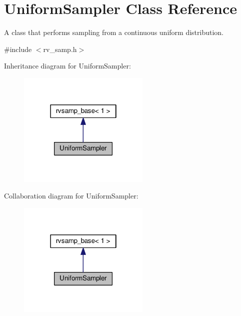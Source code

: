 \hypertarget{classUniformSampler}{}\section{Uniform\+Sampler Class Reference}
\label{classUniformSampler}


A class that performs sampling from a continuous uniform distribution.  




{\ttfamily \#include $<$rv\+\_\+samp.\+h$>$}



Inheritance diagram for Uniform\+Sampler\+:\nopagebreak
\begin{figure}[H]
\begin{center}
\leavevmode
\includegraphics[width=178pt]{classUniformSampler__inherit__graph}
\end{center}
\end{figure}


Collaboration diagram for Uniform\+Sampler\+:\nopagebreak
\begin{figure}[H]
\begin{center}
\leavevmode
\includegraphics[width=178pt]{classUniformSampler__coll__graph}
\end{center}
\end{figure}
